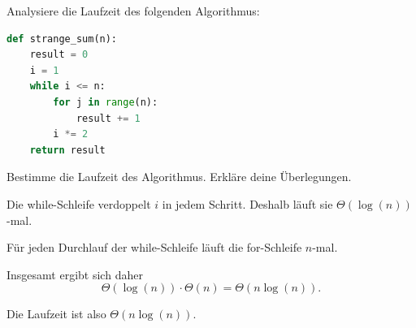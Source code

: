 \begin{questions}
    \droptotalpoints


    \question[2] Analysiere die Laufzeit des folgenden Algorithmus:
    \begin{lstlisting}[language=Python]
def strange_sum(n):
    result = 0
    i = 1
    while i <= n:
        for j in range(n):
            result += 1
        i *= 2
    return result
    \end{lstlisting}

    Bestimme die Laufzeit des Algorithmus. Erkläre deine Überlegungen.
    \begin{solution}
        Die while-Schleife verdoppelt $i$ in jedem Schritt. Deshalb läuft sie $\Theta(\log(n))$-mal.

        Für jeden Durchlauf der while-Schleife läuft die for-Schleife $n$-mal.

        Insgesamt ergibt sich daher
        \[
            \Theta(\log(n))\cdot \Theta(n)
            =
            \Theta(n\log(n)).
        \]

        Die Laufzeit ist also $\Theta(n\log(n))$.
    \end{solution}



\end{questions}
